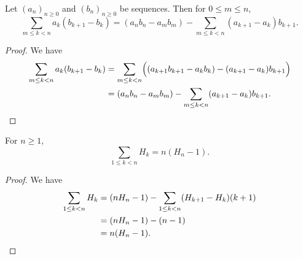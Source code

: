 \documentclass[11pt]{article}
\begin{document}
\begin{theorem}
  Let $(a_n)_{n \geq 0}$ and $(b_n)_{n \geq 0}$ be sequences.
  Then for $0 \leq m \leq n$,
  \begin{equation*}
    \sum_{m \leq k < n} a_k(b_{k+1} - b_k) = (a_nb_n - a_mb_m) - \sum_{m \leq k < n} (a_{k+1}- a_k)b_{k+1}.
  \end{equation*}
\end{theorem}
\begin{proof}
  We have
  \begin{align*}
    \sum_{m \leq k < n} a_k(b_{k+1} - b_k)
    &= \sum_{m \leq k < n} \Bigl((a_{k+1}b_{k+1} - a_kb_k) - (a_{k+1} - a_k)b_{k+1}\Bigr) \\
    &= (a_nb_n - a_mb_m) - \sum_{m \leq k < n} (a_{k+1} - a_k)b_{k+1}.
    \qedhere
  \end{align*}
\end{proof}

\begin{corollary}
  For $n \geq 1$,
  \begin{equation*}
    \sum_{1 \leq k < n} H_k = n(H_n - 1).
  \end{equation*}
\end{corollary}
\begin{proof}
  We have
  \begin{align*}
    \sum_{1 \leq k < n} H_k
    &= (nH_n - 1) - \sum_{1 \leq k < n} (H_{k+1} - H_k)(k+1) \\
    &= (nH_n - 1) - (n - 1) \\
    &= n(H_n - 1).
    \qedhere
  \end{align*}
\end{proof}
\end{document}
